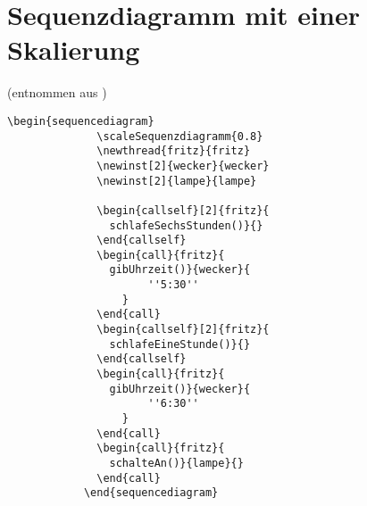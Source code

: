 \documentclass[a4paper]{scrartcl}
\begin{document}
	\section*{Sequenzdiagramm mit einer Skalierung}
	\footnotesize{(entnommen aus \materialsammlung)}
	 \begin{lstlisting}[multicols=2,gobble=7]
			\begin{sequencediagram}
			  \scaleSequenzdiagramm{0.8}
			  \newthread{fritz}{fritz}
			  \newinst[2]{wecker}{wecker}
			  \newinst[2]{lampe}{lampe}
			  
			  \begin{callself}[2]{fritz}{
			    schlafeSechsStunden()}{}
			  \end{callself}
			  \begin{call}{fritz}{
			    gibUhrzeit()}{wecker}{
					  ''5:30''
				  }
			  \end{call}
			  \begin{callself}[2]{fritz}{
			    schlafeEineStunde()}{}
			  \end{callself}
			  \begin{call}{fritz}{
			    gibUhrzeit()}{wecker}{
					  ''6:30''
				  }
			  \end{call}
			  \begin{call}{fritz}{
			    schalteAn()}{lampe}{}
			  \end{call}
			\end{sequencediagram}
	 \end{lstlisting}
 \vspace{0.6cm}
\end{document}

